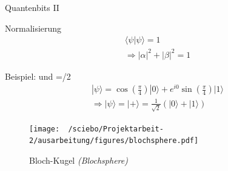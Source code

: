 \documentclass[compress,aspectratio=1610]{beamer}
\begin{document}
\begin{frame}{Quantenbits II}
  \begin{minipage}{0.45\textwidth}
    \begin{block}{Normalisierung}
      \begin{equation}\nonumber
        \begin{gathered}
          \langle \psi | \psi \rangle = 1 \\
          \Rightarrow |\alpha|^2 +|\beta|^2 = 1
        \end{gathered}
      \end{equation}
    \end{block}
    \begin{block}{Beispiel: \color{white} und \theta=\pi/2}
      \begin{equation}\nonumber
        \begin{gathered}
          |\psi\rangle = \cos\left(\frac{\pi}{4}\right)|0\rangle+e^{i0}\sin\left(\frac{\pi}{4}\right)|1\rangle \\[0.5em]
          \Rightarrow |\psi\rangle = |+\rangle = \frac{1}{\sqrt{2}}\left(|0\rangle+|1\rangle\right)
        \end{gathered}
      \end{equation}
    \end{block}
  \end{minipage}
  \hfill
  \begin{minipage}{0.45\textwidth}
    \begin{figure}
      \centering
      \texttt{[image: ~/sciebo/Projektarbeit-2/ausarbeitung/figures/blochsphere.pdf]}
      \caption{Bloch-Kugel \textit{(Blochsphere)}}
    \end{figure}
  \end{minipage}
\end{frame}
\end{document}
